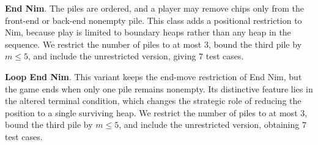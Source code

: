 \documentclass[review]{elsarticle}
\newcommand{\set}[1]{\{ #1 \}}
\newcommand{\tuple}[1]{\langle {#1} \rangle}
\newcommand{\true}{\top}
\newcommand{\statevar}{\mathcal{X}}
\newcommand{\act}{\mathcal{A}}
\newcommand{\constraint}{\mathcal{C}}
\newcommand{\estate}{\mathcal{E}}
\newcommand{\pre}{\mathtt{pre}}
\newcommand{\eff}{\mathtt{eff}}
\begin{document}
{\color{red}\textbf{End Nim}. The piles are ordered, and a player may remove chips only from the front-end or back-end nonempty pile.}
{\color{red}This class adds a positional restriction to Nim, because play is limited to boundary heaps rather than any heap in the sequence.}
{\color{red}We restrict the number of piles to at most $3$, bound the third pile by $m \le 5$, and include the unrestricted version, giving $7$ test cases.}

{\color{red}\textbf{Loop End Nim}. This variant keeps the end-move restriction of End Nim, but the game ends when only one pile remains nonempty.}
{\color{red}Its distinctive feature lies in the altered terminal condition, which changes the strategic role of reducing the position to a single surviving heap.}
{\color{red}We restrict the number of piles to at most $3$, bound the third pile by $m \le 5$, and include the unrestricted version, obtaining $7$ test cases.}
\end{document}
